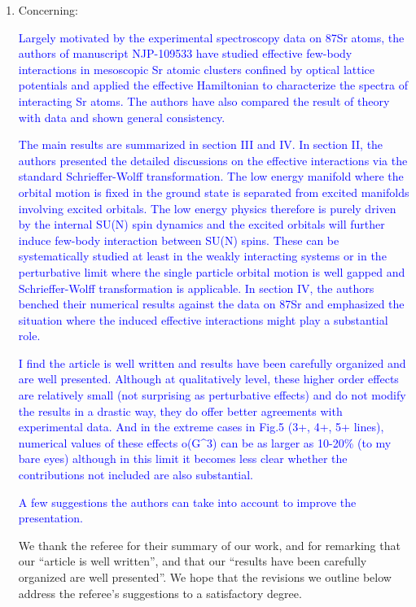 \documentclass[preprint]{revtex4-1}
\newcommand{\1}{\mathds{1}}
\newcommand{\blue}[1]{\textcolor{blue}{#1}}
\begin{document}
\begin{enumerate}
\item Concerning:

  \blue{Largely motivated by the experimental spectroscopy data on
    87Sr atoms, the authors of manuscript NJP-109533 have studied
    effective few-body interactions in mesoscopic Sr atomic clusters
    confined by optical lattice potentials and applied the effective
    Hamiltonian to characterize the spectra of interacting Sr atoms.
    The authors have also compared the result of theory with data and
    shown general consistency.}

  \blue{The main results are summarized in section III and IV.  In
    section II, the authors presented the detailed discussions on the
    effective interactions via the standard Schrieffer-Wolff
    transformation. The low energy manifold where the orbital motion
    is fixed in the ground state is separated from excited manifolds
    involving excited orbitals. The low energy physics therefore is
    purely driven by the internal SU(N) spin dynamics and the excited
    orbitals will further induce few-body interaction between SU(N)
    spins.  These can be systematically studied at least in the weakly
    interacting systems or in the perturbative limit where the single
    particle orbital motion is well gapped and Schrieffer-Wolff
    transformation is applicable. In section IV, the authors benched
    their numerical results against the data on 87Sr and emphasized
    the situation where the induced effective interactions might play
    a substantial role.}

  \blue{I find the article is well written and results have been
    carefully organized and are well presented.  Although at
    qualitatively level, these higher order effects are relatively
    small (not surprising as perturbative effects) and do not modify
    the results in a drastic way, they do offer better agreements with
    experimental data. And in the extreme cases in Fig.5 (3+, 4+, 5+
    lines), numerical values of these effects o(G\^{}3) can be as
    larger as 10-20\% (to my bare eyes) although in this limit it
    becomes less clear whether the contributions not included are also
    substantial.}

  \blue{A few suggestions the authors can take into account to improve
    the presentation.}

  We thank the referee for their summary of our work, and for
  remarking that our ``article is well written'', and that our
  ``results have been carefully organized are well presented''.  We
  hope that the revisions we outline below address the referee's
  suggestions to a satisfactory degree.



\end{enumerate}
\end{document}
